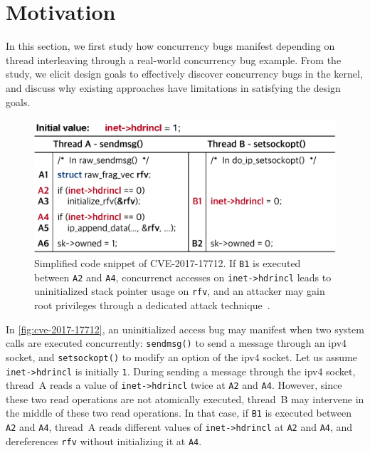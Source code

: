 \section{Motivation}
\label{s:motivation}


%
In this section, we first study how concurrency bugs manifest
depending on thread interleaving through a real-world concurrency bug
example.  From the study, we elicit design goals to effectively
discover concurrency bugs in the kernel, and discuss why existing
approaches have limitations in satisfying the design goals.

%

%
\begin{figure}[t]
  \centering
  \includegraphics[width=0.85\linewidth]{fig/cve-2017-10661.pdf}
  \caption{Simplified code snippet of CVE-2017-17712. If \texttt{B1}
    is executed between \texttt{A2} and \texttt{A4}, concurrenct
    accesses on \texttt{inet->hdrincl} leads to uninitialized stack
    pointer usage on \texttt{rfv}, and an attacker may gain root
    privileges through a dedicated attack
    technique~\cite{stackspray}.}
  \label{fig:cve-2017-17712}
\end{figure}
%
In \autoref{fig:cve-2017-17712}, an uninitialized access bug may
manifest when two system calls are executed concurrently:
\texttt{sendmsg()} to send a message through an ipv4 socket, and
\texttt{setsockopt()} to modify an option of the ipv4 socket.
Let us assume \texttt{inet->hdrincl} is initially \texttt{1}.
%
During sending a message through the ipv4 socket, thread~A reads a
value of \texttt{inet->hdrincl} twice at \texttt{A2} and \texttt{A4}.
%
However, since these two read operations are not atomically executed,
thread~B may intervene in the middle of these two read operations.
%
In that case, if \texttt{B1} is executed between \texttt{A2} and
\texttt{A4}, thread~A reads different values of \texttt{inet->hdrincl}
at \texttt{A2} and \texttt{A4}, and dereferences \texttt{rfv} without
initializing it at \texttt{A4}.


